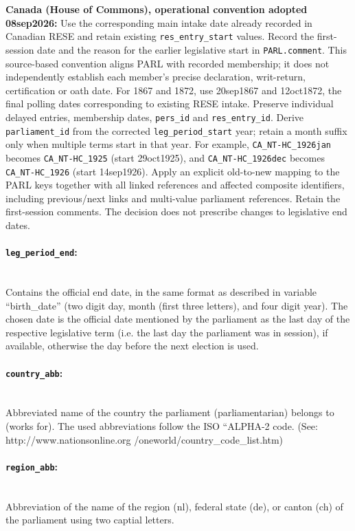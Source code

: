 \documentclass{article}
\begin{document}
    \textbf{Canada (House of Commons), operational convention adopted 08sep2026:} Use the corresponding main intake date already recorded in Canadian RESE and retain existing \texttt{res\_entry\_start} values. Record the first-session date and the reason for the earlier legislative start in \texttt{PARL.comment}. This source-based convention aligns PARL with recorded membership; it does not independently establish each member's precise declaration, writ-return, certification or oath date. For 1867 and 1872, use 20sep1867 and 12oct1872, the final polling dates corresponding to existing RESE intake. Preserve individual delayed entries, membership dates, \texttt{pers\_id} and \texttt{res\_entry\_id}. Derive \texttt{parliament\_id} from the corrected \texttt{leg\_period\_start} year; retain a month suffix only when multiple terms start in that year. For example, \texttt{CA\_NT-HC\_1926jan} becomes \texttt{CA\_NT-HC\_1925} (start 29oct1925), and \texttt{CA\_NT-HC\_1926dec} becomes \texttt{CA\_NT-HC\_1926} (start 14sep1926). Apply an explicit old-to-new mapping to the PARL keys together with all linked references and affected composite identifiers, including previous/next links and multi-value parliament references. Retain the first-session comments. The decision does not prescribe changes to legislative end dates.

\paragraph{\texttt{leg\_period\_end}:}\\
    Contains the official end date, in the same format as described in variable ``birth\_date” (two digit day, month (first three letters), and four digit year). The chosen date is the official date mentioned by the parliament as the last day of the respective legislative term (i.e. the last day the parliament was in session), if available, otherwise the day before the next election is used.

\paragraph{\texttt{country\_abb}:}\\
    Abbreviated name of the country the parliament (parliamentarian) belongs to (works for). The used abbreviations follow the ISO ``ALPHA-2 code. (See: http://www.nationsonline.org /oneworld/country\_code\_list.htm)

\paragraph{\texttt{region\_abb}:}\\
    Abbreviation of the name of the region (\gls{nl}), federal state (\gls{de}), or canton (\gls{ch}) of the parliament using two captial letters.
\end{document}
